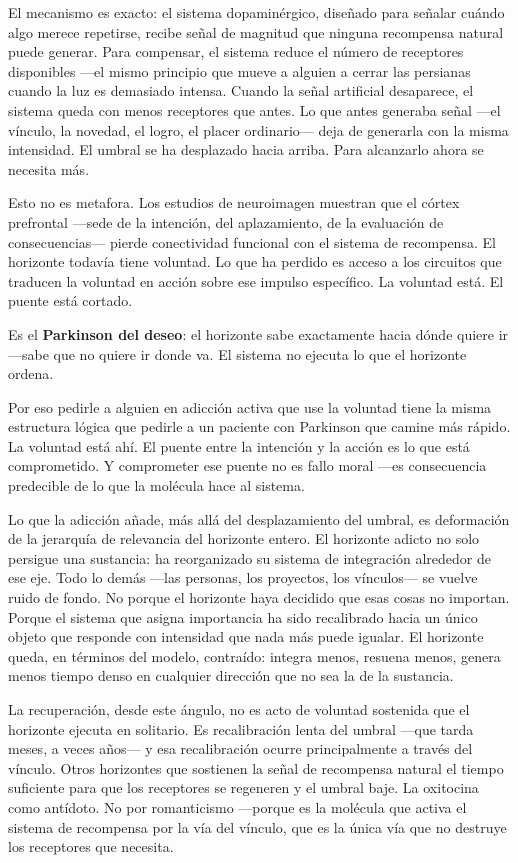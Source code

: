 El mecanismo es exacto: el sistema dopaminérgico, diseñado para señalar cuándo algo merece repetirse, recibe señal de magnitud que ninguna recompensa natural puede generar. Para compensar, el sistema reduce el número de receptores disponibles —el mismo principio que mueve a alguien a cerrar las persianas cuando la luz es demasiado intensa. Cuando la señal artificial desaparece, el sistema queda con menos receptores que antes. Lo que antes generaba señal —el vínculo, la novedad, el logro, el placer ordinario— deja de generarla con la misma intensidad. El umbral se ha desplazado hacia arriba. Para alcanzarlo ahora se necesita más.

Esto no es metafora. Los estudios de neuroimagen muestran que el córtex prefrontal —sede de la intención, del aplazamiento, de la evaluación de consecuencias— pierde conectividad funcional con el sistema de recompensa. El horizonte todavía tiene voluntad. Lo que ha perdido es acceso a los circuitos que traducen la voluntad en acción sobre ese impulso específico. La voluntad está. El puente está cortado.

Es el \textbf{Parkinson del deseo}: el horizonte sabe exactamente hacia dónde quiere ir —sabe que no quiere ir donde va. El sistema no ejecuta lo que el horizonte ordena.

Por eso pedirle a alguien en adicción activa que use la voluntad tiene la misma estructura lógica que pedirle a un paciente con Parkinson que camine más rápido. La voluntad está ahí. El puente entre la intención y la acción es lo que está comprometido. Y comprometer ese puente no es fallo moral —es consecuencia predecible de lo que la molécula hace al sistema.

Lo que la adicción añade, más allá del desplazamiento del umbral, es deformación de la jerarquía de relevancia del horizonte entero. El horizonte adicto no solo persigue una sustancia: ha reorganizado su sistema de integración alrededor de ese eje. Todo lo demás —las personas, los proyectos, los vínculos— se vuelve ruido de fondo. No porque el horizonte haya decidido que esas cosas no importan. Porque el sistema que asigna importancia ha sido recalibrado hacia un único objeto que responde con intensidad que nada más puede igualar. El horizonte queda, en términos del modelo, contraído: integra menos, resuena menos, genera menos tiempo denso en cualquier dirección que no sea la de la sustancia.

La recuperación, desde este ángulo, no es acto de voluntad sostenida que el horizonte ejecuta en solitario. Es recalibración lenta del umbral —que tarda meses, a veces años— y esa recalibración ocurre principalmente a través del vínculo. Otros horizontes que sostienen la señal de recompensa natural el tiempo suficiente para que los receptores se regeneren y el umbral baje. La oxitocina como antídoto. No por romanticismo —porque es la molécula que activa el sistema de recompensa por la vía del vínculo, que es la única vía que no destruye los receptores que necesita.

